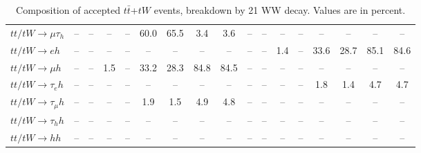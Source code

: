 \begin{sidewaystable}[p]
\begin{tabular}{|l|cc|cc|cc|cc|cc|cc|cc|cc|}
    $tt/tW \to \mu\tau_{h}$            &   -- &   -- &   -- &   -- & 60.0 & 65.5 &  3.4 &  3.6 &   -- &   -- &   -- &   -- &   -- &   -- &   -- &   -- \\ 
    $tt/tW \to eh$                     &   -- &   -- &   -- &   -- &   -- &   -- &   -- &   -- &   -- &   -- &  1.4 &   -- & 33.6 & 28.7 & 85.1 & 84.6 \\ 
    $tt/tW \to \mu h$                  &   -- &   -- &  1.5 &   -- & 33.2 & 28.3 & 84.8 & 84.5 &   -- &   -- &   -- &   -- &   -- &   -- &   -- &   -- \\ 
    $tt/tW \to \tau_{e}h$              &   -- &   -- &   -- &   -- &   -- &   -- &   -- &   -- &   -- &   -- &   -- &   -- &  1.8 &  1.4 &  4.7 &  4.7 \\ 
    $tt/tW \to \tau_{\mu}h$            &   -- &   -- &   -- &   -- &  1.9 &  1.5 &  4.9 &  4.8 &   -- &   -- &   -- &   -- &   -- &   -- &   -- &   -- \\ 
    $tt/tW \to \tau_{h}h$              &   -- &   -- &   -- &   -- &   -- &   -- &   -- &   -- &   -- &   -- &   -- &   -- &   -- &   -- &   -- &   -- \\ 
    $tt/tW \to hh$                     &   -- &   -- &   -- &   -- &   -- &   -- &   -- &   -- &   -- &   -- &   -- &   -- &   -- &   -- &   -- &   -- \\ 

    \hline
    \end{tabular}
    \caption{Composition of accepted $t\bar{t}$+$tW$ events, breakdown by 21 WW decay.  Values are in percent.}
    \label{sigcomp}
    
\end{sidewaystable}
